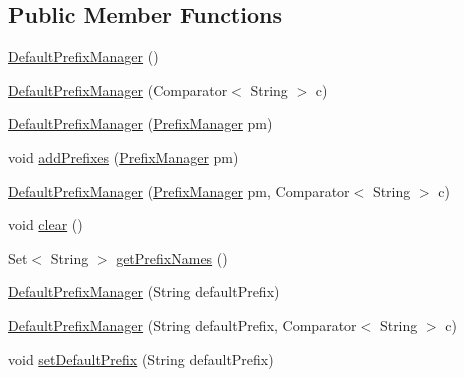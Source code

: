 \subsection*{Public Member Functions}
\begin{DoxyCompactItemize}
\item 
\hyperlink{classorg_1_1semanticweb_1_1owlapi_1_1util_1_1_default_prefix_manager_a88fdaef82aa1e3133d93567a8d362d0a}{Default\-Prefix\-Manager} ()
\item 
\hyperlink{classorg_1_1semanticweb_1_1owlapi_1_1util_1_1_default_prefix_manager_aac8003d3cd6e8fe48b17dc1eaa2efaa8}{Default\-Prefix\-Manager} (Comparator$<$ String $>$ c)
\item 
\hyperlink{classorg_1_1semanticweb_1_1owlapi_1_1util_1_1_default_prefix_manager_ad7c1b33400d38ee5fe4c0bf93ca348c8}{Default\-Prefix\-Manager} (\hyperlink{interfaceorg_1_1semanticweb_1_1owlapi_1_1model_1_1_prefix_manager}{Prefix\-Manager} pm)
\item 
void \hyperlink{classorg_1_1semanticweb_1_1owlapi_1_1util_1_1_default_prefix_manager_ab3532e9509bed30fb9b0411bd4063d11}{add\-Prefixes} (\hyperlink{interfaceorg_1_1semanticweb_1_1owlapi_1_1model_1_1_prefix_manager}{Prefix\-Manager} pm)
\item 
\hyperlink{classorg_1_1semanticweb_1_1owlapi_1_1util_1_1_default_prefix_manager_aa2b97722ba08908e8472d40bf69d02df}{Default\-Prefix\-Manager} (\hyperlink{interfaceorg_1_1semanticweb_1_1owlapi_1_1model_1_1_prefix_manager}{Prefix\-Manager} pm, Comparator$<$ String $>$ c)
\item 
void \hyperlink{classorg_1_1semanticweb_1_1owlapi_1_1util_1_1_default_prefix_manager_a5b203f48dfb74ddeb4fdd254fdde8aa3}{clear} ()
\item 
Set$<$ String $>$ \hyperlink{classorg_1_1semanticweb_1_1owlapi_1_1util_1_1_default_prefix_manager_aa0beec436abd20398c47a0c7a914da4c}{get\-Prefix\-Names} ()
\item 
\hyperlink{classorg_1_1semanticweb_1_1owlapi_1_1util_1_1_default_prefix_manager_a0c3e4281cec59349390ca4ff68bbd486}{Default\-Prefix\-Manager} (String default\-Prefix)
\item 
\hyperlink{classorg_1_1semanticweb_1_1owlapi_1_1util_1_1_default_prefix_manager_aacefac3ab802f0c5ec1ab7001612d747}{Default\-Prefix\-Manager} (String default\-Prefix, Comparator$<$ String $>$ c)
\item 
void \hyperlink{classorg_1_1semanticweb_1_1owlapi_1_1util_1_1_default_prefix_manager_a8353323902fb2167417995242f993847}{set\-Default\-Prefix} (String default\-Prefix)

\end{DoxyCompactItemize}
